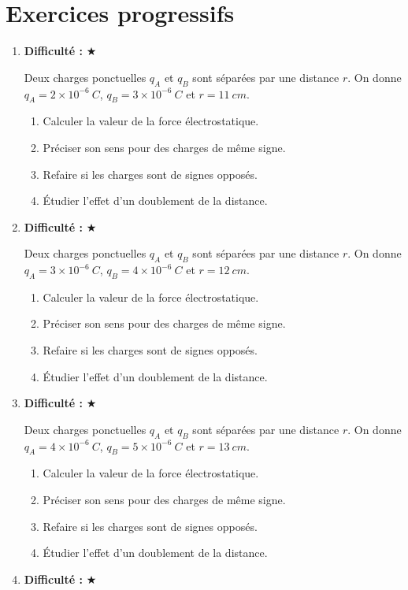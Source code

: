 \documentclass[11pt,a4paper]{article}
\newcommand{\etoiles}[1]{\textbf{Difficulté : }#1}
\begin{document}
\section{Exercices progressifs}
\begin{enumerate}[label=\textbf{Exercice \arabic*.},leftmargin=*]
\item \etoiles{★}

Deux charges ponctuelles $q_A$ et $q_B$ sont séparées par une distance $r$.
On donne $q_A=2\times 10^{-6}\ \si{C}$, $q_B=3\times 10^{-6}\ \si{C}$ et $r=11\ \si{cm}$.
\begin{enumerate}[label=\alph*)]
\item Calculer la valeur de la force électrostatique.
\item Préciser son sens pour des charges de même signe.
\item Refaire si les charges sont de signes opposés.
\item Étudier l'effet d'un doublement de la distance.
\end{enumerate}
\item \etoiles{★}

Deux charges ponctuelles $q_A$ et $q_B$ sont séparées par une distance $r$.
On donne $q_A=3\times 10^{-6}\ \si{C}$, $q_B=4\times 10^{-6}\ \si{C}$ et $r=12\ \si{cm}$.
\begin{enumerate}[label=\alph*)]
\item Calculer la valeur de la force électrostatique.
\item Préciser son sens pour des charges de même signe.
\item Refaire si les charges sont de signes opposés.
\item Étudier l'effet d'un doublement de la distance.
\end{enumerate}
\item \etoiles{★}

Deux charges ponctuelles $q_A$ et $q_B$ sont séparées par une distance $r$.
On donne $q_A=4\times 10^{-6}\ \si{C}$, $q_B=5\times 10^{-6}\ \si{C}$ et $r=13\ \si{cm}$.
\begin{enumerate}[label=\alph*)]
\item Calculer la valeur de la force électrostatique.
\item Préciser son sens pour des charges de même signe.
\item Refaire si les charges sont de signes opposés.
\item Étudier l'effet d'un doublement de la distance.
\end{enumerate}
\item \etoiles{★}


\end{enumerate}
\end{document}
